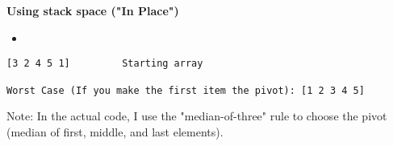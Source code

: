 \documentclass{article}
\begin{document}
\textbf{Using stack space ("In Place")}
\begin{itemize}
\item \newline
\end{itemize}

\begin{lstlisting}
[3 2 4 5 1]         Starting array

Worst Case (If you make the first item the pivot): [1 2 3 4 5] 
\end{lstlisting}

Note: In the actual code, I use the "median-of-three" rule to choose the pivot (median of first, middle, and last elements).
\end{document}
